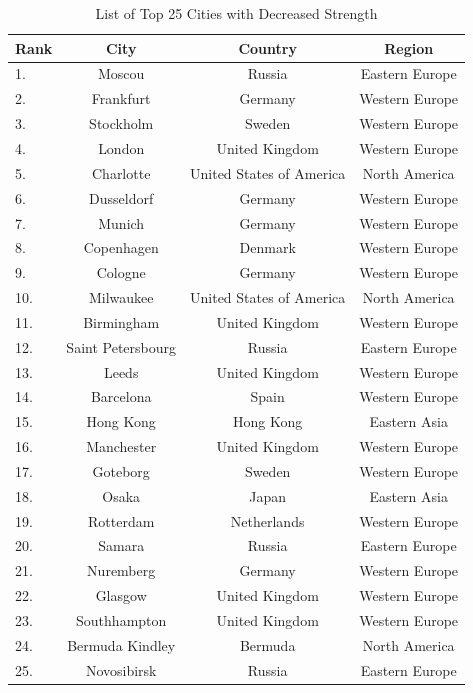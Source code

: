 \begin{table}[h]
	\centering
	\caption{List of Top 25 Cities with Decreased Strength}
	\begin{scriptsize}
	\begin{tabular}{|l|c|c|c|}
	\hline \textbf{Rank} & \textbf{City} & \textbf{Country} & \textbf{Region}  \\   
	\hline 
	 1. & Moscou 		    & Russia				 			& Eastern Europe 		\\	
	 2. & Frankfurt    		& Germany		 					& Western Europe  		\\	
	 3. & Stockholm 		& Sweden				 			& Western Europe 		\\	
	 4. & London	 		& United Kingdom 					& Western Europe 		\\	
	 5. & Charlotte 		& United States of America 			& North America 		\\	
	 6. & Dusseldorf	 	& Germany				 			& Western Europe 		\\	 			
	 7. & Munich			& Germany				 			& Western Europe 		\\	 			
	 8. & Copenhagen 		& Denmark			 				& Western Europe		\\	
	 9. & Cologne 			& Germany				 			& Western Europe		\\	
	 10. & Milwaukee		& United States of America 			& North America			\\	
	 11. & Birmingham 		& United Kingdom					& Western Europe		\\	
	 12. & Saint Petersbourg& Russia			 				& Eastern Europe		\\	
	 13. & Leeds 			& United Kingdom					& Western Europe		\\	
	 14. & Barcelona	 	& Spain				 				& Western Europe		\\	
	 15. & Hong Kong  		& Hong Kong 						& Eastern Asia			\\ 				
	 16. & Manchester 		& United Kingdom					& Western Europe		\\	
	 17. & Goteborg 		& Sweden 							& Western Europe		\\	
	 18. & Osaka 			& Japan	  							& Eastern Asia   		\\
	 19. & Rotterdam		& Netherlands 				 		& Western Europe		\\	
	 20. & Samara	 		& Russia			 				& Eastern Europe		\\	
	 21. & Nuremberg 		& Germany	 						& Western Europe		\\	
	 22. & Glasgow 			& United Kingdom			  		& Western Europe 		\\
	 23. & Southhampton		& United Kingdom			  		& Western Europe 		\\
	 24. & Bermuda Kindley	& Bermuda					  		& North America   		\\
	 25. & Novosibirsk 		& Russia  							& Eastern Europe   		\\
	\hline
	\end{tabular} 
	\end{scriptsize}
	\label{tab:appendix-B-strength-decreasing}
\end{table}


